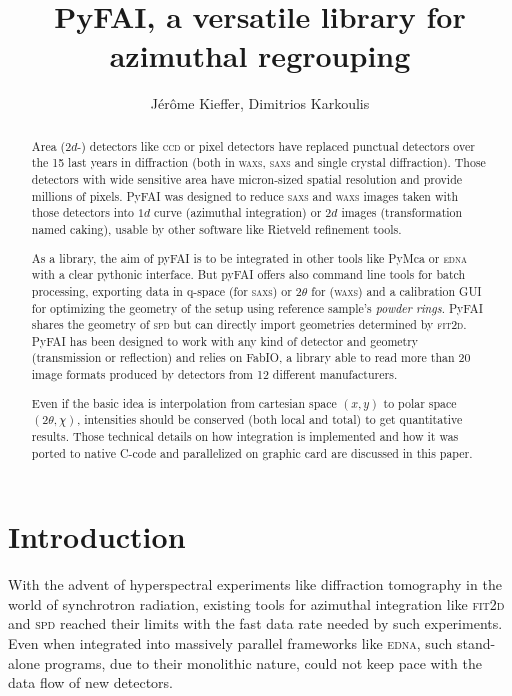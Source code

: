 \documentclass[a4paper]{jpconf}
\begin{document}
\title{PyFAI, a versatile library for azimuthal regrouping}

\author{J\'er\^ome Kieffer, Dimitrios Karkoulis}

\address{European Synchrotron Radiation Facility; 6 rue Jules Horowitz;
38043 Grenoble; France}


\begin{abstract}
Area ($2d$-) detectors like \textsc{ccd} or pixel detectors have replaced
punctual detectors over the 15 last years in diffraction (both in \textsc{waxs},
\textsc{saxs} and single crystal diffraction). Those detectors with wide sensitive area have micron-sized spatial
resolution and provide millions of pixels. PyFAI was designed to reduce \textsc{saxs} and
\textsc{waxs} images taken with those detectors into $1d$ curve (azimuthal integration)
or $2d$ images (transformation named caking), usable by other software like
Rietveld refinement tools.

As a library, the aim of pyFAI is to be integrated in other tools like
PyMca\cite{pymca} or \textsc{edna}\cite{edna} with a clear pythonic interface. But pyFAI
offers also command line tools for batch processing, exporting data in q-space (for \textsc{saxs}) or 2$\theta$ for
(\textsc{waxs}) and a calibration GUI for optimizing the geometry of the setup
using reference sample's \textit{powder rings}.  PyFAI shares the geometry
of \textsc{spd}\cite{spd} but can directly import geometries determined by
\textsc{fit2d}\cite{fit2d1996}.
PyFAI has been designed to work with any kind of detector and geometry (transmission or reflection) and
relies on FabIO\cite{fabio}, a library able to read more than 20 image
formats produced by detectors from 12 different manufacturers.

Even if the basic idea is interpolation from cartesian space $(x,y)$ to polar
space $(2\theta, \chi )$, intensities should be conserved (both local and total)
to get quantitative results.  Those technical details on how integration is implemented
and how it was ported to native C-code and parallelized on graphic card are
discussed  in this paper.
\end{abstract}

\section{Introduction}

With the advent of hyperspectral experiments like diffraction tomography in the
world of synchrotron radiation, existing tools for azimuthal integration like
\textsc{fit2d}\cite{fit2d1996} and \textsc{spd}\cite{spd} reached their limits with the fast data rate
needed by such experiments. Even when integrated into massively parallel
frameworks like \textsc{edna}\cite{edna}, such stand-alone programs, due to their
monolithic nature, could not keep pace with the data flow of new detectors.
\end{document}
